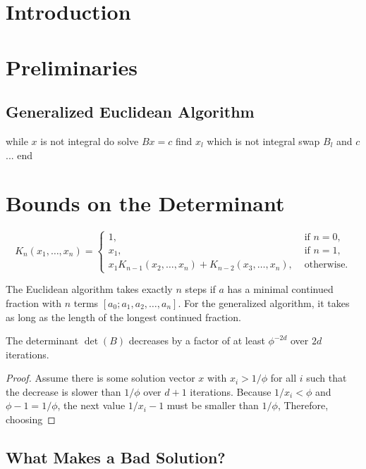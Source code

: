 \documentclass[english,version-2020-11]{uzl-thesis}
\begin{document}
\chapter{Introduction}

\chapter{Preliminaries}

\section{Generalized Euclidean Algorithm}

\begin{Pseudocode}
while $x$ is not integral do
  solve $Bx = c$
  find $x_l$ which is not integral
  swap $B_l$ and $c$
  ...
end
\end{Pseudocode}

\chapter{Bounds on the Determinant}

\[
  K_n(x_1, \dots, x_n) =
  \begin{cases}
    1, & \text{ if } n = 0, \\
    x_1, & \text{ if } n = 1, \\
    x_1 K_{n-1}(x_2, \dots, x_n) + K_{n-2}(x_3, \dots, x_n), & \text{ otherwise.}
  \end{cases}
\]

The Euclidean algorithm takes exactly $n$ steps if $a$ has a minimal continued
fraction with $n$ terms $[a_0; a_1, a_2, \dots, a_n]$. For the generalized
algorithm, it takes as long as the length of the longest continued fraction.

\begin{theorem}
  The determinant $\det(B)$ decreases by a factor of at least $\phi^{-2d}$ over
  $2d$ iterations.
\end{theorem}

\begin{proof}
  Assume there is some solution vector $x$ with $x_i > 1/\phi$ for all $i$
  such that the decrease is slower than $1/\phi$ over $d+1$ iterations.
  Because $1/x_i < \phi$ and $\phi - 1 = 1/\phi$,
  the next value $1/x_i - 1$ must be smaller than $1/\phi$,
  Therefore, choosing
\end{proof}

\section{What Makes a Bad Solution?}
\end{document}
